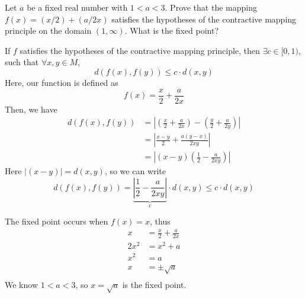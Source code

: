 \documentclass[11pt]{article}
\begin{document}
\begin{homeworkProblem}
    Let $a$ be a fixed real number with $1 < a < 3$. Prove that the mapping $f (x) = (x/2) + (a/2x)$
    satisfies the hypotheses of the contractive mapping principle on the domain $(1, \infty)$. What is
    the fixed point? \\

    \solution

    If $f$ satisfies the hypotheses of the contractive mapping principle, then $\exists c \in [0, 1)$, such that $\forall x, y \in M$,
    \[
        d(f(x), f(y)) \leq c \cdot d(x, y)
    \]
    Here, our function is defined as
    \[
        f(x) = \frac{x}{2} + \frac{a}{2x}
    \]
    Then, we have
    \begin{align*}
        d(f(x), f(y)) & = \left| \left( \frac{x}{2} + \frac{a}{2x} \right) - \left( \frac{y}{2} + \frac{a}{2y} \right) \right| \\
                      & = \left| \frac{x - y}{2} + \frac{a(y - x)}{2xy} \right|                                                \\
                      & = \left| (x - y) \left( \frac{1}{2} - \frac{a}{2xy} \right) \right|
    \end{align*}
    Here $|(x-y)| = d(x, y)$, so we can write
    \[
        d(f(x), f(y)) = \underbrace{\left| \frac{1}{2} - \frac{a}{2xy} \right|}_{c} \cdot d(x, y) \leq c \cdot d(x, y)
    \]

    The fixed point occurs when $f(x) = x$, thus
    \begin{align*}
        x    & = \frac{x}{2} + \frac{a}{2x} \\
        2x^2 & = x^2 + a                    \\
        x^2  & = a                          \\
        x    & = \pm \sqrt{a}               \\
    \end{align*}
    We know $1 < a < 3$, so $x = \sqrt{a}$ is the fixed point. \\

\end{homeworkProblem}

\pagebreak
\end{document}
